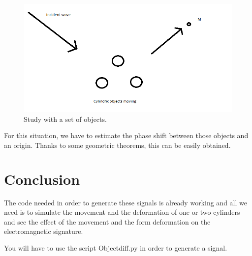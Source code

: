 \begin{figure}[H]
\centering
    \includegraphics[scale=0.6,angle=0]{Images/Image4.png}
    \caption{Study with a set of objects.}
    \label{fig:Image4}
\end{figure}

For this situation, we have to estimate the phase shift between those objects and an origin. Thanks to some geometric theorems, this can be easily obtained. 


\bigskip

\chapter*{Conclusion}
The code needed in order to generate these signals is already working and all we need is to simulate the movement and the deformation of one or two cylinders and see the effect of the movement and the form deformation on the electromagnetic signature.

You will have to use the script Objectdiff.py in order to generate a signal.